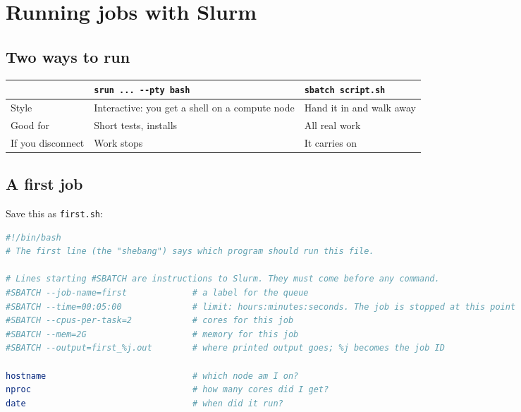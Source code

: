 \chapter{Running jobs with Slurm}
\label{ch:slurm}

\section{Two ways to run}\label{two-ways-to-run}

{\def\LTcaptype{none} %
\begin{longtable}[]{@{}
  >{\raggedright\arraybackslash}p{}
  >{\raggedright\arraybackslash}p{}
  >{\raggedright\arraybackslash}p{}@{}}
\toprule\noalign{}
\begin{minipage}[b]{\linewidth}\raggedright
\end{minipage} & \begin{minipage}[b]{\linewidth}\raggedright
\texttt{srun\ ...\ -\/-pty\ bash}
\end{minipage} & \begin{minipage}[b]{\linewidth}\raggedright
\texttt{sbatch\ script.sh}
\end{minipage} \\
\midrule\noalign{}
\endhead
\bottomrule\noalign{}
\endlastfoot
Style & Interactive: you get a shell on a compute node & Hand it in and walk away \\
Good for & Short tests, installs & All real work \\
If you disconnect & Work stops & It carries on \\
\end{longtable}
}

\section{A first job}\label{a-first-job}

Save this as \texttt{first.sh}:

\begin{lstlisting}[language=bash]
#!/bin/bash
# The first line (the "shebang") says which program should run this file.

# Lines starting #SBATCH are instructions to Slurm. They must come before any command.
#SBATCH --job-name=first             # a label for the queue
#SBATCH --time=00:05:00              # limit: hours:minutes:seconds. The job is stopped at this point
#SBATCH --cpus-per-task=2            # cores for this job
#SBATCH --mem=2G                     # memory for this job
#SBATCH --output=first_%j.out        # where printed output goes; %j becomes the job ID

hostname                             # which node am I on?
nproc                                # how many cores did I get?
date                                 # when did it run?
\end{lstlisting}

